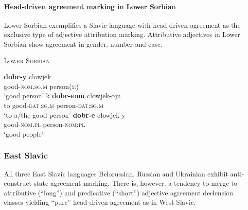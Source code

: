 \paragraph{Head-driven agreement marking in Lower Sorbian}
Lower Sorbian exemplifies a Slavic language with head-driven agreement as the exclusive type of adjective attribution marking. Attributive adjectives in Lower Sorbian show agreement in gender, number and case. 
\begin{exe}
\ex \textsc{Lower Sorbian} \citep{janas1976}
\begin{xlist}
\ex
\gll	\textbf{dobr-y} cłowjek\\
	good-\textsc{nom.sg.m} person(\textsc{m})\\
\glt	‘good person’
\ex
\gll	k \textbf{dobr-emu} cłowjek-oju\\
	to good-\textsc{dat.sg.m} person-\textsc{dat:sg.m}\\
\glt	‘to a/the good person’
\ex
\gll	\textbf{dobr-e} cłowjek-y\\
	good-\textsc{nom.pl} person-\textsc{nom:pl}\\
\glt	‘good people’
\end{xlist}
\end{exe}

\subsubsection{East Slavic}
All three East Slavic languages Belorussian, Russian and Ukrainian exhibit anti-construct state agreement marking. There is, however, a tendency to merge to attributive (“long”) and predicative (“short”) adjective agreement declension classes yielding “pure” head-driven agreement as in West Slavic.

